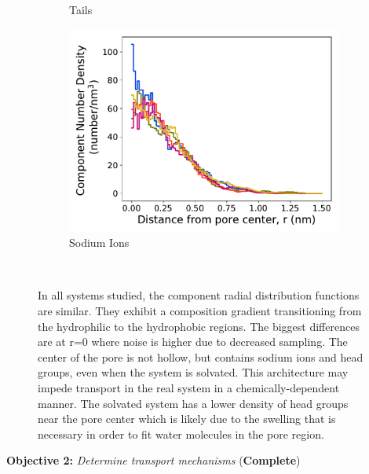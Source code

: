 \documentclass{article}
\begin{document}
\begin{figure}[!htb]
\begin{subfigure}{0.32\textwidth}
        \caption{Tails}
        \label{fig:tails_regional_density}
  \end{subfigure}
  \begin{subfigure}{0.32\textwidth}
        \includegraphics[width=1\linewidth]{sodium_density.pdf}
        \caption{Sodium Ions}
        \label{fig:sodium_regional_density}
  \end{subfigure}
  \caption{In all systems studied, the component radial distribution functions are similar.
      They exhibit a composition gradient transitioning from the hydrophilic to the hydrophobic
          regions. The biggest differences are at r=0 where noise is higher due to
          decreased sampling. The center of the pore is not hollow, but contains sodium ions and
          head groups, even when the system is solvated. This architecture may impede transport in
          the real system in a chemically-dependent manner.
          The solvated system has a lower density of head groups near the
          pore center which is likely due to the swelling that is necessary in order to fit water
          molecules in the pore region.}~\label{fig:overlaid_densities}
  \vspace{-0.5cm}
  \end{figure}
  
  \noindent \textbf{\large Objective 2:} \textit{\large Determine transport mechanisms} (\textcolor{green!40!olive}{\textbf{Complete}})
\end{document}
